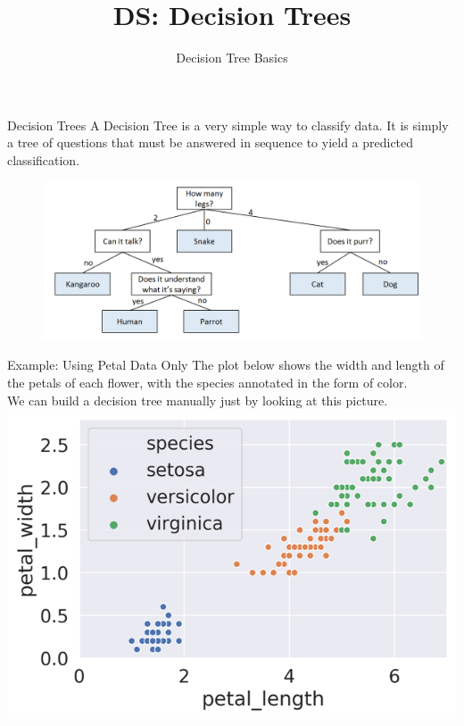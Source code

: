 \documentclass[aspectratio=169]{../latex_main/tntbeamer}  %
\title[Introduction]{DS: Decision Trees}
\subtitle{Decision Tree Basics}
\begin{document}
	\maketitle

	\begin{frame}{Decision Trees}
	    A Decision Tree is a very simple way to classify data. It is simply a tree of questions that must be answered in sequence to yield a predicted classification.
	    \begin{figure}
	        \centering
	        \includegraphics[scale=.35]{figure_tree/Bild1}
	    \end{figure}
	\end{frame}
 
	\begin{frame}{Example: Using Petal Data Only}
	    The plot below shows the width and length of the petals of each flower, with the species annotated in the form of color.\\
	    \bigskip
	    We can build a decision tree manually just by looking at this picture.
	        \centering
	        \includegraphics[scale=.65]{figure_tree/Bild3}

	\end{frame}
	
\end{document}
